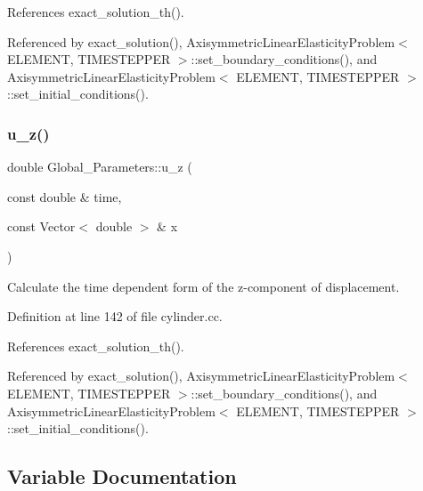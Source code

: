 References exact\+\_\+solution\+\_\+th().



Referenced by exact\+\_\+solution(), Axisymmetric\+Linear\+Elasticity\+Problem$<$ E\+L\+E\+M\+E\+N\+T, T\+I\+M\+E\+S\+T\+E\+P\+P\+E\+R $>$\+::set\+\_\+boundary\+\_\+conditions(), and Axisymmetric\+Linear\+Elasticity\+Problem$<$ E\+L\+E\+M\+E\+N\+T, T\+I\+M\+E\+S\+T\+E\+P\+P\+E\+R $>$\+::set\+\_\+initial\+\_\+conditions().

\mbox{\label{namespaceGlobal__Parameters_adc24d54054d6868dfb4bf3eedb2b062d}} 
\subsubsection{\texorpdfstring{u\+\_\+z()}{u\_z()}}
{\footnotesize\ttfamily double Global\+\_\+\+Parameters\+::u\+\_\+z (\begin{DoxyParamCaption}\item[{const double \&}]{time,  }\item[{const Vector$<$ double $>$ \&}]{x }\end{DoxyParamCaption})}



Calculate the time dependent form of the z-\/component of displacement. 



Definition at line 142 of file cylinder.\+cc.



References exact\+\_\+solution\+\_\+th().



Referenced by exact\+\_\+solution(), Axisymmetric\+Linear\+Elasticity\+Problem$<$ E\+L\+E\+M\+E\+N\+T, T\+I\+M\+E\+S\+T\+E\+P\+P\+E\+R $>$\+::set\+\_\+boundary\+\_\+conditions(), and Axisymmetric\+Linear\+Elasticity\+Problem$<$ E\+L\+E\+M\+E\+N\+T, T\+I\+M\+E\+S\+T\+E\+P\+P\+E\+R $>$\+::set\+\_\+initial\+\_\+conditions().



\subsection{Variable Documentation}
\mbox{\label{namespaceGlobal__Parameters_aa3dfbdb1b2fd80d516850f66c96b6fd0}} 
